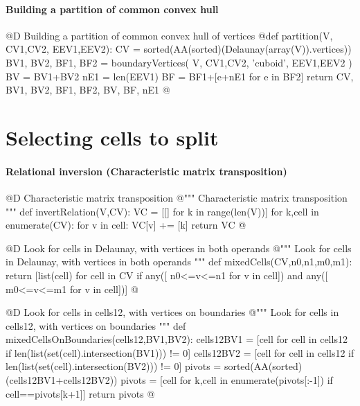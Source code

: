 \documentclass[11pt,oneside]{article}	%
\begin{document}
\paragraph{Building a partition of common convex hull}

@D Building a partition of common convex hull of vertices
@{def partition(V, CV1,CV2, EEV1,EEV2):
	CV = sorted(AA(sorted)(Delaunay(array(V)).vertices))
	BV1, BV2, BF1, BF2 = boundaryVertices( V, CV1,CV2, 'cuboid', EEV1,EEV2 )
	BV = BV1+BV2
	nE1 = len(EEV1)
	BF = BF1+[e+nE1 for e in BF2]
	return CV, BV1, BV2, BF1, BF2, BV, BF, nE1
@}




\section{Selecting cells to split}


\paragraph{Relational inversion (Characteristic matrix transposition)}

@D Characteristic matrix transposition
@{""" Characteristic matrix transposition """
def invertRelation(V,CV):
	VC = [[] for k in range(len(V))]
	for k,cell in enumerate(CV):
		for v in cell:
			VC[v] += [k]
	return VC
@}


@D Look for cells in Delaunay, with vertices in both operands
@{""" Look for cells in Delaunay, with vertices in both operands """
def mixedCells(CV,n0,n1,m0,m1):
	return [list(cell) for cell in CV if any([ n0<=v<=n1 for v in cell]) 
		and any([ m0<=v<=m1 for v in cell])]
@}

@D Look for cells in cells12, with vertices on boundaries
@{""" Look for cells in cells12, with vertices on boundaries """
def mixedCellsOnBoundaries(cells12,BV1,BV2):
	cells12BV1 = [cell for cell in cells12
					if len(list(set(cell).intersection(BV1))) != 0]
	cells12BV2 = [cell for cell in cells12
					if len(list(set(cell).intersection(BV2))) != 0]
	pivots = sorted(AA(sorted)(cells12BV1+cells12BV2))
	pivots = [cell for k,cell in enumerate(pivots[:-1]) if cell==pivots[k+1]]
	return pivots
@}
\end{document}
